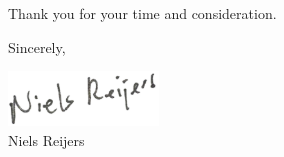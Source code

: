 \documentclass[10pt,a4paper]{../altacv}
\begin{document}
\begin{fullwidth}
\begin{changemargin}{2cm}{2cm}
\bigskip

Thank you for your time and consideration.

\bigskip

\bigskip

Sincerely,

\hspace{.5cm}
\includegraphics[width=4cm]{handtekening.png} \\
Niels Reijers

\end{changemargin}

\end{fullwidth}
\end{document}

